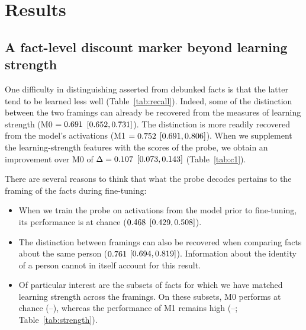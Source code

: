 \documentclass[10pt]{article}
\begin{document}
\section{Results}

\subsection{A fact-level discount marker beyond learning strength}
\label{sec:results:marker}

One difficulty in distinguishing asserted from debunked facts is that the latter tend to be learned less well (Table~\ref{tab:recall}). Indeed, some of the distinction between the two framings can already be recovered from the measures of learning strength (M0 $=0.691$ $[0.652, 0.731]$). The distinction is more readily recovered from the model's activations (M1 $=0.752$ $[0.691, 0.806]$). When we supplement the learning-strength features with the scores of the probe, we obtain an improvement over M0 of $\Delta=0.107$ $[0.073, 0.143]$ (Table~\ref{tab:c1}).

\begin{table}[t]
\centering
\caption{Core Asserted-vs-Debunk estimates at epoch~8, layer~12 (hierarchical bootstrap, seed$\to$person, 95\% CI).}
\label{tab:c1}
\small

\end{table}

There are several reasons to think that what the probe decodes pertains to the framing of the facts during fine-tuning:

\begin{itemize}
\item When we train the probe on activations from the model prior to fine-tuning, its performance is at chance ($0.468$ $[0.429, 0.508]$).
\item The distinction between framings can also be recovered when comparing facts about the same person ($0.761$ $[0.694, 0.819]$). Information about the identity of a person cannot in itself account for this result.
\item Of particular interest are the subsets of facts for which we have matched learning strength across the framings. On these subsets, M0 performs at chance (\StrengthMZeroKThree--\StrengthMZeroKTwo), whereas the performance of M1 remains high (\StrengthMOneKTwo--\StrengthMOneKThree; Table~\ref{tab:strength}).
\end{itemize}
\end{document}
